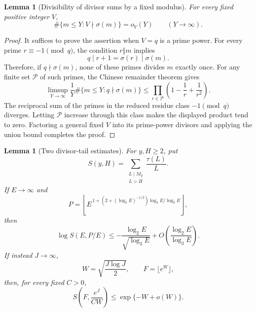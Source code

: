 \documentclass[11pt]{article}
\newtheorem{lemma}[theorem]{Lemma}
\theoremstyle{remark}
\newcommand{\1}{\mathbf 1}
\begin{document}
\begin{lemma}[Divisibility of divisor sums by a fixed modulus]
\label{lem:fixed-modulus-normality}
For every fixed positive integer $V$,
\[
 \#\{m\leq Y:V\nmid\sigma(m)\}=o_V(Y)
 \qquad(Y\to\infty).
\]
\end{lemma}

\begin{proof}
It suffices to prove the assertion when $V=q$ is a prime power.  For every
prime $r\equiv-1\pmod q$, the condition $r\Vert m$ implies
\[
 q\mid r+1=\sigma(r)\mid\sigma(m).
\]
Therefore, if $q\nmid\sigma(m)$, none of these primes divides $m$ exactly
once.  For any finite set $\mathcal P$ of such primes, the Chinese remainder
theorem gives
\[
 \limsup_{Y\to\infty}\frac1Y
       \#\{m\leq Y:q\nmid\sigma(m)\}
 \leq\prod_{r\in\mathcal P}
            \left(1-\frac1r+\frac1{r^2}\right).
\]
The reciprocal sum of the primes in the reduced residue class
$-1\pmod q$ diverges.  Letting $\mathcal P$ increase through this class makes
the displayed product tend to zero.  Factoring a general fixed $V$ into its
prime-power divisors and applying the union bound completes the proof.
\end{proof}

\begin{lemma}[Two divisor-tail estimates]
\label{lem:kernel-tails}
For $y,H\geq2$, put
\[
 S(y,H)=\sum_{\substack{L\mid M_y\\L>H}}\frac{\tau(L)}L.
\]
If $E\to\infty$ and
\[
 P=\left\lfloor
 E^{\,1+(2+(\log_3 E)^{-1/2})\log_2E/\log_3E}
 \right\rfloor,
\]
then
\begin{equation}\label{eq:fixed-kernel-tail}
 \log S(E,P/E)
 \leq-\frac{\log_2E}{\sqrt{\log_3E}}
      +O\left(\frac{\log_2E}{\log_3E}\right).
\end{equation}
If instead $J\to\infty$,
\[
 W=\sqrt{\frac{J\log J}{2}},
 \qquad F=\lfloor e^W\rfloor,
\]
then, for every fixed $C>0$,
\begin{equation}\label{eq:moving-kernel-tail}
 S\left(F,\frac{e^J}{CW}\right)
 \leq\exp\{-W+o(W)\}.
\end{equation}
\end{lemma}
\end{document}
